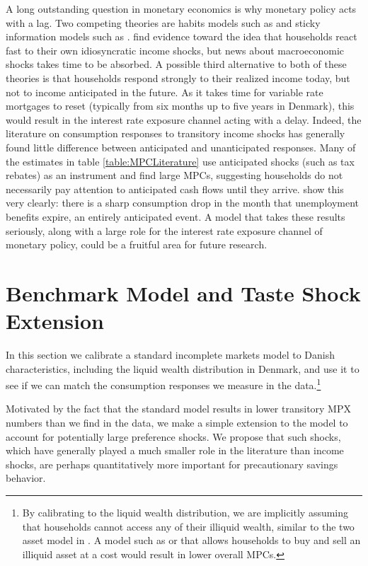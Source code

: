 \documentclass[titlepage]{\econtex}\newcommand{\texname}{ConsumptionHeterogeneity}
\begin{document}
A long outstanding question in monetary economics is why monetary policy acts with a lag. Two competing theories are habits models such as \cite{fuhrer_habit_2000} and sticky information models such as \cite{mankiw_sticky_2002}. \cite{carroll_sticky_2018} find evidence toward the idea that households react fast to their own idiosyncratic income shocks, but news about macroeconomic shocks takes time to be absorbed. A possible third alternative to both of these theories is that households respond strongly to their realized income today, but not to income anticipated in the future. As it takes time for variable rate mortgages to reset (typically from six months up to five years in Denmark), this would result in the interest rate exposure channel acting with a delay. Indeed, the literature on consumption responses to transitory income shocks has generally found little difference between anticipated and unanticipated responses. Many of the estimates in table \ref{table:MPCLiterature} use anticipated shocks (such as tax rebates) as an instrument and find large MPCs, suggesting households do not necessarily pay attention to anticipated cash flows until they arrive. \cite{ganong_consumer_2017} show this very clearly: there is a sharp consumption drop in the month that unemployment benefits expire, an entirely anticipated event. A model that takes these results seriously, along with a large role for the interest rate exposure channel of monetary policy, could be a fruitful area for future research. 

\section{Benchmark Model and Taste Shock Extension} \label{model}
In this section we calibrate a standard incomplete markets model to Danish characteristics, including the liquid wealth distribution in Denmark, and use it to see if we can match the consumption responses we measure in the data.\footnote{By calibrating to the liquid wealth distribution, we are implicitly assuming that households cannot access any of their illiquid wealth, similar to the two asset model in \cite{auclert_ikc}. A model such as \cite{violante_wealthy_2014} or \cite{gorea_liquidity_2017} that allows households to buy and sell an illiquid asset at a cost would result in lower overall MPCs.}

Motivated by the fact that the standard model results in lower transitory MPX numbers than we find in the data, we make a simple extension to the model to account for potentially large preference shocks. We propose that such shocks, which have generally played a much smaller role in the literature than income shocks, are perhaps quantitatively more important for precautionary savings behavior.
\end{document}
